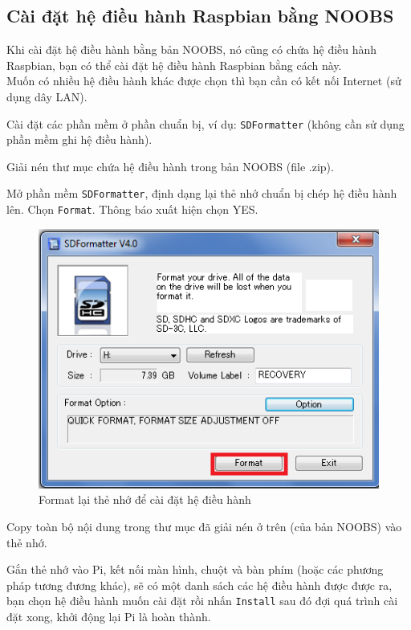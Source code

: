\subsection{Cài đặt hệ điều hành Raspbian bằng NOOBS}
Khi cài đặt hệ điều hành bằng bản NOOBS, nó cũng có chứa hệ điều hành Raspbian, bạn có thể cài đặt hệ điều hành Raspbian bằng cách này.\\

Muốn có nhiều hệ điều hành khác được chọn thì bạn cần có kết nối Internet (sử dụng dây LAN).
\begin{list}{--}{}
\item Cài đặt các phần mềm ở phần chuẩn bị, ví dụ: \verb|SDFormatter| (không cần sử dụng phần mềm ghi hệ điều hành).
\item Giải nén thư mục chứa hệ điều hành trong bản NOOBS (file .zip).
\item Mở phần mềm \verb|SDFormatter|, định dạng lại thẻ nhớ chuẩn bị chép hệ điều hành lên. Chọn \verb|Format|. Thông báo xuất hiện chọn YES.
\begin{figure}[!h]
\begin{center}
\includegraphics[scale=.4]{setup-os/images/SDFormatter}
\end{center}
\caption{Format lại thẻ nhớ để cài đặt hệ điều hành}
\end{figure}
\item Copy toàn bộ nội dung trong thư mục đã giải nén ở trên (của bản NOOBS) vào thẻ nhớ.
\item Gắn thẻ nhớ vào Pi, kết nối màn hình, chuột và bàn phím (hoặc các phương pháp tương đương khác), sẽ có một danh sách các hệ điều hành được được ra, bạn chọn hệ điều hành muốn cài đặt rồi nhấn \verb|Install| sau đó đợi quá trình cài đặt xong, khởi động lại Pi là hoàn thành.

\end{list}
